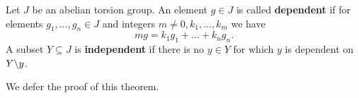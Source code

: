 \begin{definition}
    Let $J$ be an abelian torsion group. An element  $g \in J$ is called \textbf {dependent} if for
    elements $ g_1, \dots, g_n \in J$ and integers $m \neq 0, k_1, \dots, k_m$ we have 
        \begin{equation}
            mg=k_1g_1+\dots+k_ng_n.
        \end{equation}
    A subset $Y \subseteq J$ is \textbf {independent} if there is no $y \in Y$ for which  $y$ is
    dependent on  $Y\backslash y$.
\end{definition}
We defer the proof of this theorem.


